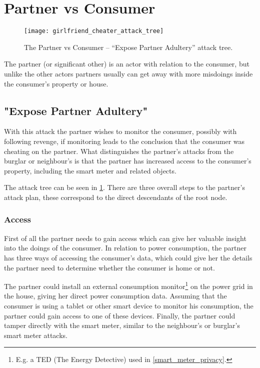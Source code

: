 
\section{Partner vs Consumer}

\begin{figure}
	\texttt{[image: girlfriend\_cheater\_attack\_tree]}
	\caption{The Partner vs Consumer -- ``Expose Partner Adultery'' attack tree.}
	\label{fig:attack_trees:partner:cheater}
\end{figure}

The partner (or significant other) is an actor with relation to the consumer, but unlike the other actors partners usually can get away with more misdoings inside the consumer's property or house.

\subsection{"Expose Partner Adultery"}

With this attack the partner wishes to monitor the consumer, possibly with following revenge, if monitoring leads to the conclusion that the consumer was cheating on the partner.
What distinguishes the partner's attacks from the burglar or neighbour's is that the partner has increased access to the consumer's property, including the smart meter and related objects.

The attack tree can be seen in \cref{fig:attack_trees:partner:cheater}.
There are three overall steps to the partner's attack plan, these correspond to the direct descendants of the root node.

\subsubsection{Access}
First of all the partner needs to gain access which can give her valuable insight into the doings of the consumer.
In relation to power consumption, the partner has three ways of accessing the consumer's data, which could give her the details the partner need to determine whether the consumer is home or not.

The partner could install an external consumption monitor\footnote{E.g. a TED (The Energy Detective) used in \cref {smart_meter_privacy}.} on the power grid in the house, giving her direct power consumption data.
Assuming that the consumer is using a tablet or other smart device to monitor his consumption, the partner could gain access to one of these devices.
Finally, the partner could tamper directly with the smart meter, similar to the neighbour's or burglar's smart meter attacks.

